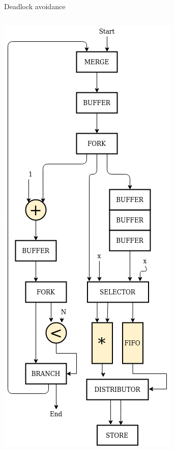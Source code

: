 \documentclass{beamer}
\begin{document}
\begin{frame}{Deadlock avoidance}
\begin{columns}[T]
\begin{column}{0.25\textwidth}
      \includegraphics[scale=0.25]{blocking_shared.png}
    \end{column}
  \end{columns}
\end{frame}
\end{document}
